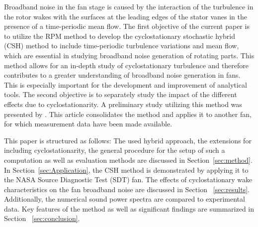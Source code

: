 Broadband noise in the fan stage is caused by the interaction of the turbulence in the rotor wakes with the surfaces at the leading edges of the stator vanes in the presence of a time-periodic mean flow.  %
The first objective of the current paper is to utilize the RPM method to develop the cyclostationary stochastic hybrid (CSH) method to include time-periodic turbulence variations and mean flow, which are essential in studying broadband noise generation of rotating parts. 
This method allows for an in-depth study of cyclostationary turbulence and therefore contributes to a greater understanding of broadband noise generation in fans. This is especially important for the development and improvement of analytical tools. The second objective is to separately study the impact of the different effects due to cyclostationarity. A preliminary study utilizing this method was presented by \citet{wohlbrandt_extension_2015}. This article consolidates the method and applies it to another fan, for which measurement data have been made available.


This paper is structured as follows:  The used hybrid approach, the extensions for including cyclostationarity, the general procedure for the setup of such a computation as well as evaluation methods are discussed in Section~\ref{sec:method}.  In Section~\ref{sec:Application}, the CSH method is demonstrated by applying it to the NASA Source Diagnostic Test (SDT) fan.  The effects of cyclostationary wake characteristics on the fan broadband noise are discussed in Section ~\ref{sec:results}.  Additionally, the numerical sound power spectra are compared to experimental data.  Key features of the method as well as significant findings are summarized in Section ~\ref{sec:conclusion}.      

